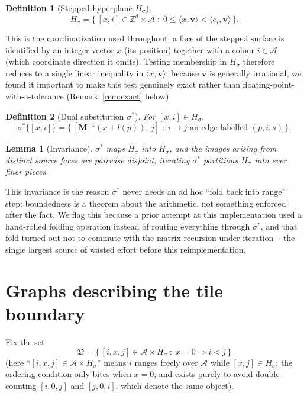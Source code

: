 \documentclass[11pt]{article}
\newtheorem{definition}{Definition}
\newtheorem{lemma}{Lemma}
\begin{document}
\begin{definition}[Stepped hyperplane $H_\sigma$]
$$H_\sigma = \{\,[x,i]\in\mathbb{Z}^d\times\mathcal{A} \;:\; 0\le \langle x,\mathbf{v}\rangle < \langle e_i,\mathbf{v}\rangle\,\}.$$
\end{definition}

This is the coordinatization used throughout: a face of the stepped surface is
identified by an integer vector $x$ (its position) together with a colour
$i\in\mathcal{A}$ (which coordinate direction it omits). Testing membership in
$H_\sigma$ therefore reduces to a single linear inequality in $\langle
x,\mathbf{v}\rangle$; because $\mathbf{v}$ is generally irrational, we found it
important to make this test genuinely exact rather than floating-point-with-a-tolerance
(Remark~\ref{rem:exact} below).

\begin{definition}[Dual substitution $\sigma^*$]
For $[x,i]\in H_\sigma$,
$$\sigma^*\{[x,i]\} = \{\,[\mathbf{M}^{-1}(x+l(p)),\,j]\;:\;i\to j \text{ an edge labelled } (p,i,s)\,\}.$$
\end{definition}

\begin{lemma}[Invariance]
$\sigma^*$ maps $H_\sigma$ into $H_\sigma$, and the images arising from
distinct source faces are pairwise disjoint; iterating $\sigma^*$ partitions
$H_\sigma$ into ever finer pieces.
\end{lemma}

This invariance is the reason $\sigma^*$ never needs an ad hoc ``fold back into
range'' step: boundedness is a theorem about the arithmetic, not something
enforced after the fact. We flag this because a prior attempt at this
implementation used a hand-rolled folding operation instead of routing
everything through $\sigma^*$, and that fold turned out not to commute with
the matrix recursion under iteration -- the single largest source of wasted
effort before this reimplementation.

\section{Graphs describing the tile boundary}

Fix the set
$$\mathfrak{D} = \{\,[i,x,j]\in\mathcal{A}\times H_\sigma \;:\; x=0 \Rightarrow i<j\,\}$$
(here ``$[i,x,j]\in\mathcal{A}\times H_\sigma$'' means $i$ ranges freely over
$\mathcal{A}$ while $[x,j]\in H_\sigma$; the ordering condition only bites when
$x=0$, and exists purely to avoid double-counting $[i,0,j]$ and $[j,0,i]$,
which denote the same object).
\end{document}
